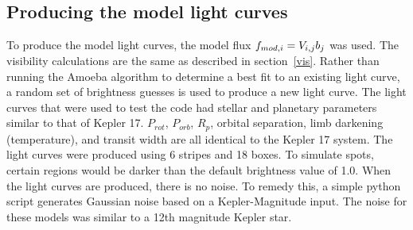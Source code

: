 

\subsection{Producing the model light curves \label{modelLC}}
To produce the model light curves, the model flux $\mbox{$f_{mod,i}$} = V_{i,j} b_j$ was used. The visibility calculations are the same as described in section~\ref{vis}. Rather than running the Amoeba algorithm to determine a best fit to an existing light curve, a random set of brightness guesses is used to produce a new light curve. The light curves that were used to test the code had stellar and planetary parameters similar to that of Kepler 17. $P_{rot}$, $P_{orb}$, $R_p$, orbital separation, limb darkening (temperature), and transit width are all identical to the Kepler 17 system. The light curves were produced using 6 stripes and 18 boxes. To simulate spots, certain regions would be darker than the default brightness value of 1.0. When the light curves are produced, there is no noise. To remedy this, a simple python script generates Gaussian noise based on a Kepler-Magnitude input. The noise for these models was similar to a 12th magnitude Kepler star.




